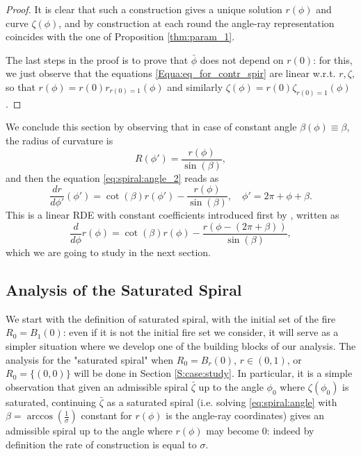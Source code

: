 \documentclass[reqno]{amsart}
\theoremstyle{definition} \newtheorem{definition}{Definition}[section]
\theoremstyle{definition} \newtheorem{remark}[definition]{Remark}
\theoremstyle{plain} \newtheorem{lemma}[definition]{Lemma}
\theoremstyle{plain} \newtheorem{proposition}[definition]{Proposition}
\theoremstyle{plain} \newtheorem{theorem}[definition]{Theorem}
\theoremstyle{plain} \newtheorem{corollary}[definition]{Corollary}
\theoremstyle{definition} \newtheorem{example}[definition]{Example}
\theoremstyle{plain} \newtheorem{claim}[clai]{Claim}
\theoremstyle{definition} \newtheorem{assumption}[definition]{Assumption}
\theoremstyle{definition} \newtheorem{observation}[definition]{Observation}
\newcommand{\1}{\mathbbm 1}
\numberwithin{equation}{section} %
\theoremstyle{plain} \newtheorem*{theorem*}{Theorem}
\theoremstyle{plain} \newtheorem{mthm}[maintheorem]{Main Theorem}
\theoremstyle{plain} \newtheorem*{mthm*}{Main Theorem}
\theoremstyle{plain} \newtheorem*{conjecture*}{Conjecture}
\theoremstyle{plain} \newtheorem{conjecture}[definition]{Conjecture}
\theoremstyle{plain} \newtheorem*{problem*}{Problem}
\begin{document}
\begin{proof}
It is clear that such a construction gives a unique solution $r(\phi)$ and curve $\zeta(\phi)$, and by construction at each round the angle-ray representation coincides with the one of Proposition \ref{thm:param_1}.

\medskip

The last steps in the proof is to prove that $\bar \phi$ does not depend on $r(0)$: for this, we just observe that the equations \eqref{Equa:eq_for_contr_spir} are linear w.r.t. $r,\zeta$, so that $r(\phi) = r(0) r_{r(0)=1}(\phi)$ and similarly $\zeta(\phi) = r(0) \zeta_{r(0) = 1}(\phi)$. %
%
\end{proof}

We conclude this section by observing that in case of constant angle $\beta(\phi) \equiv \beta$, the radius of curvature is
\begin{equation*}%
R(\phi')=\frac{r(\phi)}{\sin(\beta)},
\end{equation*}
and then the equation \eqref{eq:spiral:angle_2} reads as
\begin{equation*}
\frac{dr}{d\phi'}(\phi') = \cot(\beta) r(\phi') - \frac{r(\phi)}{\sin(\beta)}, \quad \phi' = 2\pi + \phi + \beta.
\end{equation*}
This is a linear RDE with constant coefficients introduced first by \cite{firefighter}, written as
\begin{equation}
\label{Equa:linear_retarded_1}
\frac{d}{d\phi}r(\phi) = \cot(\beta) r(\phi) - \frac{r(\phi - (2\pi + \beta))}{\sin(\beta)},
\end{equation}
which we are going to study in the next section.


\subsection{Analysis of the Saturated Spiral}
\label{Sss:equation_satur}


We start with the definition of saturated spiral, with the initial set of the fire $R_0 = B_1(0)$: even if it is not the initial fire set we consider, it will serve as a simpler situation where we develop one of the building blocks of our analysis. The analysis for the "saturated spiral" when $R_0 = B_r(0)$, $r \in (0,1)$, or $R_0 = \{(0,0)\}$ will be done in Section \ref{S:case:study}. In particular, it is a simple observation that given an admissible spiral $\bar \zeta$ up to the angle $\phi_0$ where $\zeta(\phi_0)$ is saturated, continuing $\bar \zeta$ as a saturated spiral (i.e. solving \eqref{eq:spiral:angle} with $\beta = \arccos(\frac{1}{\sigma})$ constant for $r(\phi)$ is the angle-ray coordinates) gives an admissible spiral up to the angle where $r(\phi)$ may become $0$: indeed by definition the rate of construction is equal to $\sigma$.
\end{document}
